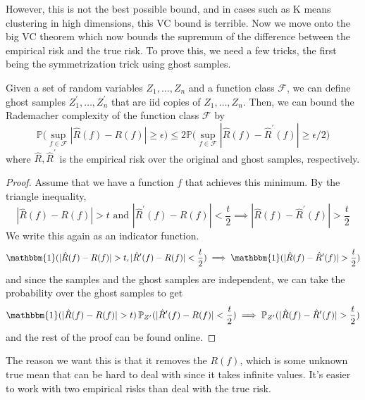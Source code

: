 \documentclass{article}
\begin{document}
  However, this is not the best possible bound, and in cases such as K means clustering in high dimensions, this VC bound is terrible. Now we move onto the big VC theorem which now bounds the supremum of the difference between the empirical risk and the true risk. To prove this, we need a few tricks, the first being the symmetrization trick using ghost samples. 

  \begin{lemma}
    Given a set of random variables $Z_1, \ldots, Z_n$ and a function class $\mathcal{F}$, we can define ghost samples $Z_1^\prime, \ldots, Z_n^\prime$ that are iid copies of $Z_1, \ldots, Z_n$. Then, we can bound the Rademacher complexity of the function class $\mathcal{F}$ by 
    \begin{equation}
      \mathbb{P} \bigg( \sup_{f \in \mathcal{F}} | \hat{R} (f) - R(f) | \geq \epsilon \bigg) \leq 2 \mathbb{P} \bigg( \sup_{f \in \mathcal{F}} | \hat{R} (f) - \hat{R}^\prime (f) | \geq \epsilon / 2 \bigg)
    \end{equation}
    where $\hat{R}, \hat{R}^\prime$ is the empirical risk over the original and ghost samples, respectively. 
  \end{lemma}
  \begin{proof}
    Assume that we have a function $f$ that achieves this minimum. By the triangle inequality, 
    \begin{equation}
      | \hat{R} (f) - R(f)| > t \text{ and } | \hat{R}^\prime (f) - R(f)| < \frac{t}{2} \implies | \hat{R} (f) - \hat{R}^\prime (f) | > \frac{t}{2}
    \end{equation}
    We write this again as an indicator function. 
    \begin{equation}
      \mathbbm{1} (| \hat{R} (f) - R(f)| > t, | \hat{R}^\prime (f) - R(f)| < \frac{t}{2}) \implies \mathbbm{1} (| \hat{R} (f) - \hat{R}^\prime (f) | > \frac{t}{2})
    \end{equation}
    and since the samples and the ghost samples are independent, we can take the probability over the ghost samples to get 
    \begin{equation}
      \mathbbm{1} (| \hat{R} (f) - R(f)| > t) \, \mathbb{P}_{Z^\prime} (| \hat{R}^\prime (f) - R(f)| < \frac{t}{2}) \implies \mathbb{P}_{Z^\prime} (| \hat{R} (f) - \hat{R}^\prime (f) | > \frac{t}{2})
    \end{equation}
    and the rest of the proof can be found online. 
  \end{proof}

  The reason we want this is that it removes the $R(f)$, which is some unknown true mean that can be hard to deal with since it takes infinite values. It's easier to work with two empirical risks than deal with the true risk. 
\end{document}
